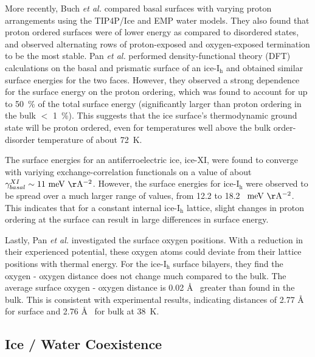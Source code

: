 More recently, Buch \textit{et al.} compared basal surfaces with
varying proton arrangements using the TIP4P/Ice and EMP water
models.\cite{Buch2008} They also found that proton ordered surfaces
were of lower energy as compared to disordered states, and observed
alternating rows of proton-exposed and oxygen-exposed termination to
be the most stable.  Pan \textit{et al.} performed density-functional
theory (DFT) calculations on the basal and prismatic surface of an
ice-I$_\mathrm{h}$ and obtained similar surface energies for the two
faces.\cite{Pan2010} However, they observed a strong dependence for
the surface energy on the proton ordering, which was found to account
for up to 50~\% of the total surface energy (significantly larger than
proton ordering in the bulk $<$ 1~\%). This suggests that the ice
surface's thermodynamic ground state will be proton ordered, even for
temperatures well above the bulk order-disorder temperature of about
72~K.

The surface energies for an antiferroelectric ice, ice-XI, were found
to converge with variying exchange-correlation functionals on a value
of about $\gamma_{basal}^{XI} \sim 11~\mathrm{meV~\AA^{-2}}$. However,
the surface energies for ice-I$_\mathrm{h}$ were observed to be spread
over a much larger range of values, from 12.2 to 18.2~
$\mathrm{meV~\AA^{-2}}$. This indicates that for a constant internal
ice-I$_\mathrm{h}$ lattice, slight changes in proton ordering at the
surface can result in large differences in surface energy.

Lastly, Pan \textit{et al.} investigated the surface oxygen
positions. With a reduction in their experienced potential, these
oxygen atoms could deviate from their lattice positions with thermal
energy. For the ice-I$_\mathrm{h}$ surface bilayers, they find the
oxygen - oxygen distance does not change much compared to the
bulk. The average surface oxygen - oxygen distance is 0.02 \AA~
greater than found in the bulk. This is consistent with experimental
results, indicating distances of 2.77 \AA~ for surface and 2.76 \AA~
for bulk at 38~K.\cite{Parent2002} 

\subsection{Ice / Water Coexistence}
%

